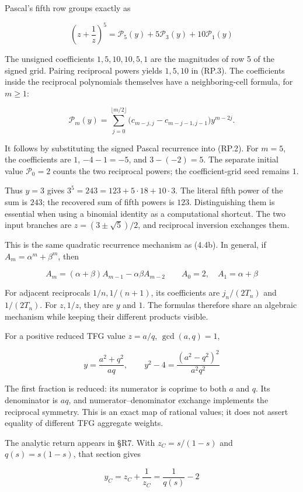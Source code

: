 \documentclass[
  11pt,
]{book}
\begin{document}
Pascal's fifth row groups exactly as

\[
\left(z+\frac1z\right)^5
=\mathcal P_5(y)+5\mathcal P_3(y)+10\mathcal P_1(y)
\tag{RP.3}
\]

The unsigned coefficients \(1,5,10,10,5,1\) are the magnitudes of row 5
of the signed grid. Pairing reciprocal powers yields \(1,5,10\) in
(RP.3). The coefficients inside the reciprocal polynomials themselves
have a neighboring-cell formula, for \(m\ge1\):

\[
\mathcal P_m(y)=\sum_{j=0}^{\lfloor m/2\rfloor}
\bigl(c_{m-j,j}-c_{m-j-1,j-1}\bigr)y^{m-2j}.
\tag{RP.3a}
\]

It follows by substituting the signed Pascal recurrence into (RP.2). For
\(m=5\), the coefficients are \(1\), \(-4-1=-5\), and \(3-(-2)=5\). The
separate initial value \(\mathcal P_0=2\) counts the two reciprocal
powers; the coefficient-grid seed remains \(1\).

Thus \(y=3\) gives \(3^5=243=123+5\cdot18+10\cdot3\). The literal fifth
power of the sum is \(243\); the recovered sum of fifth powers is
\(123\). Distinguishing them is essential when using a binomial identity
as a computational shortcut. The two input branches are
\(z=(3\pm\sqrt5)/2\), and reciprocal inversion exchanges them.

This is the same quadratic recurrence mechanism as (4.4b). In general,
if \(A_m=\alpha^m+\beta^m\), then

\[
A_m=(\alpha+\beta)A_{m-1}-\alpha\beta A_{m-2}
\qquad A_0=2,\quad A_1=\alpha+\beta
\tag{RP.4}
\]

For adjacent reciprocals \(1/n,1/(n+1)\), its coefficients are
\(j_n/(2T_n)\) and \(1/(2T_n)\). For \(z,1/z\), they are \(y\) and
\(1\). The formulas therefore share an algebraic mechanism while keeping
their different products visible.

For a positive reduced TFG value \(z=a/q\), \(\gcd(a,q)=1\),

\[
y=\frac{a^2+q^2}{aq},\qquad
y^2-4=\frac{(a^2-q^2)^2}{a^2q^2}
\tag{RP.5}
\]

The first fraction is reduced: its numerator is coprime to both \(a\)
and \(q\). Its denominator is \(aq\), and numerator--denominator
exchange implements the reciprocal symmetry. This is an exact map of
rational values; it does not assert equality of different TFG aggregate
weights.

The analytic return appears in §R7. With \(z_C=s/(1-s)\) and
\(q(s)=s(1-s)\), that section gives

\[
y_C=z_C+\frac1{z_C}=\frac1{q(s)}-2
\tag{RP.6}
\]
\end{document}
